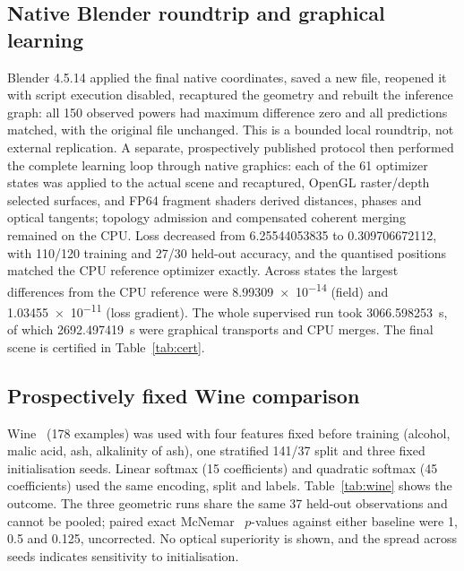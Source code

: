 \documentclass[11pt,a4paper]{article}
\begin{document}
\subsection{Native Blender roundtrip and graphical learning}
Blender 4.5.14 applied the final native coordinates, saved a new file, reopened it with script execution disabled, recaptured the geometry and rebuilt the inference graph: all 150 observed powers had maximum difference zero and all predictions matched, with the original file unchanged. This is a bounded local roundtrip, not external replication. A separate, prospectively published protocol then performed the complete learning loop through native graphics: each of the 61 optimizer states was applied to the actual scene and recaptured, OpenGL raster/depth selected surfaces, and FP64 fragment shaders derived distances, phases and optical tangents; topology admission and compensated coherent merging remained on the CPU. Loss decreased from \num{6.25544053835} to \num{0.309706672112}, with 110/120 training and 27/30 held-out accuracy, and the quantised positions matched the CPU reference optimizer exactly. Across states the largest differences from the CPU reference were \num{8.99309e-14} (field) and \num{1.03455e-11} (loss gradient). The whole supervised run took \SI{3066.598253}{s}, of which \SI{2692.497419}{s} were graphical transports and CPU merges. The final scene is certified in Table~\ref{tab:cert}.

\subsection{Prospectively fixed Wine comparison}
Wine~\cite{uciwine} (178 examples) was used with four features fixed before training (alcohol, malic acid, ash, alkalinity of ash), one stratified 141/37 split and three fixed initialisation seeds. Linear softmax (15 coefficients) and quadratic softmax (45 coefficients) used the same encoding, split and labels. Table~\ref{tab:wine} shows the outcome. The three geometric runs share the same 37 held-out observations and cannot be pooled; paired exact McNemar~\cite{mcnemar1947} $p$-values against either baseline were 1, 0.5 and 0.125, uncorrected. No optical superiority is shown, and the spread across seeds indicates sensitivity to initialisation.
\end{document}
